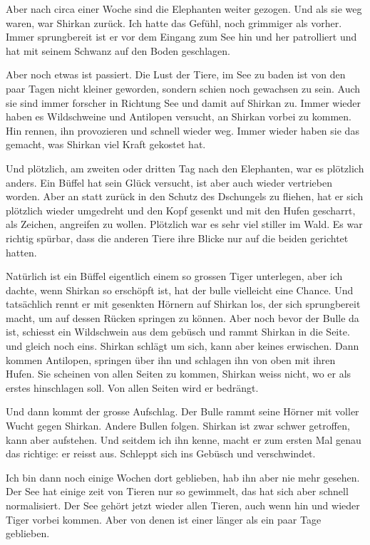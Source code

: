 Aber nach circa einer Woche sind die Elephanten weiter gezogen. Und als sie weg waren, war Shirkan zurück. Ich hatte das Gefühl, noch grimmiger als vorher. Immer sprungbereit ist er vor dem Eingang zum See hin und her patrolliert und hat mit seinem Schwanz auf den Boden geschlagen.

Aber noch etwas ist passiert. Die Lust der Tiere, im See zu baden ist von den paar Tagen nicht kleiner geworden, sondern schien noch gewachsen zu sein. Auch sie sind immer forscher in Richtung See und damit auf Shirkan zu. Immer wieder haben es Wildschweine und Antilopen versucht, an Shirkan vorbei zu kommen. Hin rennen, ihn provozieren und schnell wieder weg. Immer wieder haben sie das gemacht, was Shirkan viel Kraft gekostet hat. 

Und plötzlich, am zweiten oder dritten Tag nach den Elephanten, war es plötzlich anders. Ein Büffel hat sein Glück versucht, ist aber auch wieder vertrieben worden. Aber an statt zurück in den Schutz des Dschungels zu fliehen, hat er sich plötzlich wieder umgedreht und den Kopf gesenkt und mit den Hufen gescharrt, als Zeichen, angreifen zu wollen. Plötzlich war es sehr viel stiller im Wald. Es war richtig spürbar, dass die anderen Tiere ihre Blicke nur auf die beiden gerichtet hatten. 

Natürlich ist ein Büffel eigentlich einem so grossen Tiger unterlegen, aber ich dachte, wenn Shirkan so erschöpft ist, hat der bulle vielleicht eine Chance. Und tatsächlich rennt er mit gesenkten Hörnern auf Shirkan los, der sich sprungbereit macht, um auf dessen Rücken springen zu können. Aber noch bevor der Bulle da ist, schiesst ein Wildschwein aus dem gebüsch und rammt Shirkan in die Seite. und gleich noch eins. Shirkan schlägt um sich, kann aber keines erwischen. Dann kommen Antilopen, springen über ihn und schlagen ihn von oben mit ihren Hufen. Sie scheinen von allen Seiten zu kommen, Shirkan weiss nicht, wo er als erstes hinschlagen soll. Von allen Seiten wird er bedrängt. 

Und dann kommt der grosse Aufschlag. Der Bulle rammt seine Hörner mit voller Wucht gegen Shirkan. Andere Bullen folgen. Shirkan ist zwar schwer getroffen, kann aber aufstehen. Und seitdem ich ihn kenne, macht er zum ersten Mal genau das richtige: er reisst aus. Schleppt sich ins Gebüsch und verschwindet. 

Ich bin dann noch einige Wochen dort geblieben, hab ihn aber nie mehr gesehen. Der See hat einige zeit von Tieren nur so gewimmelt, das hat sich aber schnell normalisiert. Der See gehört jetzt wieder allen Tieren, auch wenn hin und wieder Tiger vorbei kommen. Aber von denen ist einer länger als ein paar Tage geblieben.\hfill {\color{DeepPink}\decofourleft}
